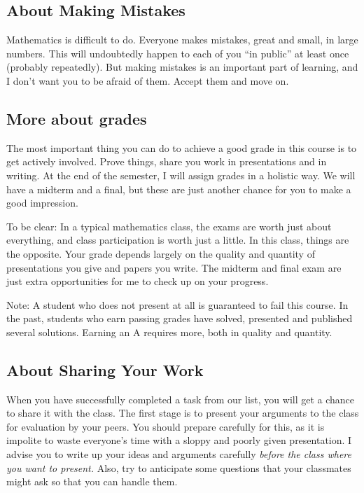 \documentclass{tufte-handout}
\theoremstyle{definition}
\begin{document}
\subsection*{About Making Mistakes} Mathematics is difficult to do. Everyone makes mistakes, great and small, in large numbers. This will undoubtedly happen to each of you ``in public'' at least once (probably repeatedly). But making mistakes is an important part of learning, and I don't want you to be afraid of them. Accept them and move on.

\subsection*{More about grades} The most important thing you can do to achieve a good grade in this course is to get actively involved. Prove things, share you work in presentations and in writing. At the end of the semester, I will assign grades in a holistic way. We will have a midterm and a final, but these are just another chance for you to make a good impression. 

To be clear: In a typical mathematics class, the exams are worth just about everything, and class participation is worth just a little. In this class, things are the opposite. Your grade depends largely on the quality and quantity of presentations you give and papers you write. The midterm and final exam are just extra opportunities for me to check up on your progress.

Note: A student who does not present at all is guaranteed to fail this course. In the past, students who earn passing grades have solved, presented and published several solutions. Earning an A requires more, both in quality and quantity.

\subsection*{About Sharing Your Work} When you have successfully completed a task from our list, you will get a chance to share it with the class. The first stage is to present your arguments to the class for evaluation by your peers. You should prepare carefully for this, as it is impolite to waste everyone's time with a sloppy and poorly given presentation. I advise you to write up your ideas and arguments carefully \emph{before the class where you want to present.} Also, try to anticipate some questions that your classmates might ask so that you can handle them.
\end{document}
